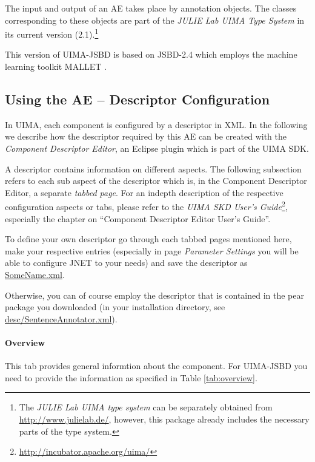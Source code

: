 \documentclass[11pt,a4paper,halfparskip]{scrartcl}
\begin{document}
The input and output of an AE takes place by annotation objects. The
classes corresponding to these objects are part of the \emph{JULIE Lab
  UIMA Type System} in its current version (2.1).\footnote{The
  \emph{JULIE Lab UIMA type system} can be separately obtained from
  \url{http://www.julielab.de/}, however, this package already
  includes the necessary parts of the type system.}

This version of UIMA-JSBD is based on JSBD-2.4 which employs the
machine learning toolkit MALLET \cite{McCallum2002}.




\subsection{Using the AE -- Descriptor Configuration}

In UIMA, each component is configured by a descriptor in XML. In the
following we describe how the descriptor required by this AE can be
created with the \emph{Component Descriptor Editor}, an Eclipse plugin
which is part of the UIMA SDK.

A descriptor contains information on different aspects. The following
subsection refers to each sub aspect of the descriptor which is, in
the Component Descriptor Editor, a separate \emph{tabbed page}. For an
indepth description of the respective configuration aspects or tabs,
please refer to the \emph{UIMA SKD User's
  Guide}\footnote{\url{http://incubator.apache.org/uima/}}, especially
the chapter on ``Component Descriptor Editor User's Guide''.

To define your own descriptor go through each tabbed pages mentioned
here, make your respective entries (especially in page \emph{Parameter
  Settings} you will be able to configure JNET to your needs) and save
the descriptor as \url{SomeName.xml}.

Otherwise, you can of course employ the descriptor that is contained
in the pear package you downloaded (in your installation directory, see
\url{desc/SentenceAnnotator.xml}).

\paragraph{Overview}
This tab provides general informtion about the component. For 
UIMA-JSBD you need to provide the information as specified in Table
\ref{tab:overview}.
\end{document}
